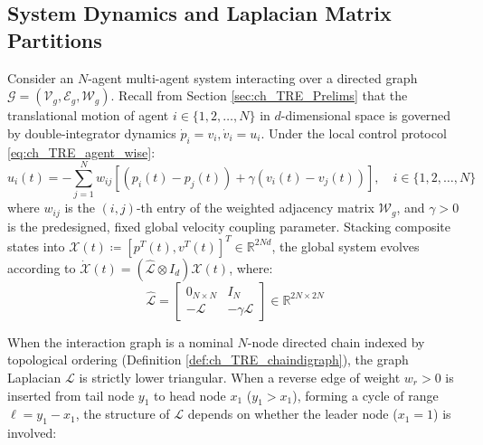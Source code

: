 \subsection{System Dynamics and Laplacian Matrix Partitions}
Consider an $N$-agent multi-agent system interacting over a directed graph $\mathcal{G} = (\mathcal{V}_g, \mathcal{E}_g, \mathcal{W}_g)$. Recall from Section \ref{sec:ch_TRE_Prelims} that the translational motion of agent $i \in \{1, 2, \dots, N\}$ in $d$-dimensional space is governed by double-integrator dynamics $\dot{p}_i = v_i, \dot{v}_i = u_i$. Under the local control protocol \eqref{eq:ch_TRE_agent_wise}:
\begin{equation} \label{eq:ch_GC_control_law}
	u_i(t) = -\sum_{j=1}^{N} w_{ij} \left[ (p_i(t) - p_j(t)) + \gamma (v_i(t) - v_j(t)) \right], \quad i \in \{1, 2, \dots, N\}
\end{equation}
where $w_{ij}$ is the $(i,j)$-th entry of the weighted adjacency matrix $\mathcal{W}_g$, and $\gamma > 0$ is the predesigned, fixed global velocity coupling parameter. Stacking composite states into $\mathcal{X}(t) \coloneqq [p^T(t), v^T(t)]^T \in \mathbb{R}^{2Nd}$, the global system evolves according to $\dot{\mathcal{X}}(t) = (\hat{\mathcal{L}} \otimes I_d) \mathcal{X}(t)$, where:
\begin{equation}\label{eq:ch_GC_hat_laplacian}
	\hat{\mathcal{L}} = \begin{bmatrix} 0_{N \times N} & I_N \\ -\mathcal{L} & -\gamma \mathcal{L} \end{bmatrix} \in \mathbb{R}^{2N \times 2N}
\end{equation}

When the interaction graph is a nominal $N$-node directed chain indexed by topological ordering (Definition \ref{def:ch_TRE_chaindigraph}), the graph Laplacian $\mathcal{L}$ is strictly lower triangular. When a reverse edge of weight $w_r > 0$ is inserted from tail node $y_1$ to head node $x_1$ ($y_1 > x_1$), forming a cycle of range $\ell = y_1 - x_1$, the structure of $\mathcal{L}$ depends on whether the leader node ($x_1 = 1$) is involved:

